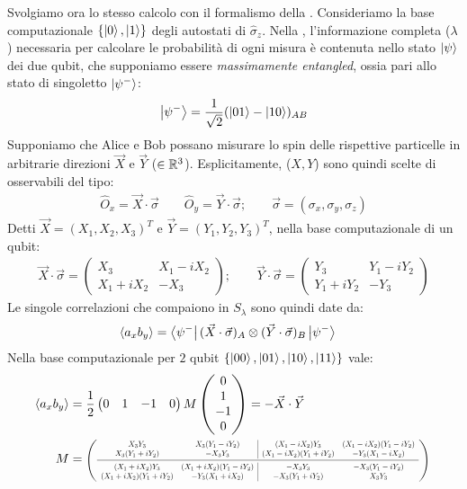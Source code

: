 \documentclass[../../InformazioneQuantistica.tex]{subfiles}
\begin{document}
Svolgiamo ora lo stesso calcolo con il formalismo della \MQ. Consideriamo la base computazionale $\{\Ket{0},\Ket{1}\}$ degli autostati di $\hat{\sigma}_z$. Nella \MQ, l'informazione completa ($\lambda$) necessaria per calcolare le probabilità di ogni misura è contenuta nello stato $\Ket{\psi}$ dei due qubit, che supponiamo essere \textit{massimamente entangled}, ossia pari allo stato di singoletto $\Ket{\psi^-}$:
\begin{align*}
\Ket{\psi^-}=\frac{1}{\sqrt{2}}(\Ket{01}-\Ket{10})_{AB}
\end{align*}
Supponiamo che Alice e Bob possano misurare lo spin delle rispettive particelle in arbitrarie direzioni $\vec{X}$ e $\vec{Y}$ ($\in \mathbb{R}^3$). Esplicitamente, ($X,Y$) sono quindi scelte di osservabili del tipo:
\begin{align*}
\hat{O}_x = \vec{X}\cdot \vec{\sigma} \qquad \hat{O}_y = \vec{Y}\cdot \vec{\sigma}; \qquad \vec{\sigma} = (\sigma_x, \sigma_y,\sigma_z)
\end{align*}
Detti $\vec{X} = (X_1, X_2, X_3)^T$ e $\vec{Y}=(Y_1, Y_2, Y_3)^T$, nella base computazionale di un qubit:
\begin{align*}
\vec{X} \cdot \vec{\sigma} = \begin{pmatrix} X_3 & X_1-iX_2\\ X_1 +iX_2 & -X_3\end{pmatrix}; \qquad \vec{Y} \cdot \vec{\sigma} = \begin{pmatrix} Y_3 & Y_1-iY_2\\ Y_1+iY_2 & -Y_3 \end{pmatrix}
\end{align*}
Le singole correlazioni che compaiono in $S_\lambda$ sono quindi date da:
\begin{align*}
\langle a_x b_y\rangle &= \Bra{\psi^-}(\vec{X} \cdot \vec{\sigma})_A \otimes (\vec{Y} \cdot \vec{\sigma})_B \Ket{\psi^-}
\end{align*}
Nella base computazionale per $2$ qubit $\{\Ket{00}, \Ket{01}, \Ket{10}, \Ket{11}\}$ vale:
\begin{align}\label{eqn:corr-mq}
\langle a_xb_y \rangle &= \frac{1}{2} \begin{pmatrix} 0 & 1 & -1 & 0 \end{pmatrix} M \begin{pmatrix} 
0 \\ 1 \\ -1 \\ 0
\end{pmatrix} = - \vec{X}\cdot \vec{Y} \\ \nonumber
M&= 
 \resizebox{0.8\hsize}{!}{%
$\left({\begin{array}{cc|cc}
X_3 Y_3 & X_3(Y_1-iY_2) & (X_1-iX_2)Y_3 & (X_1-iX_2)(Y_1-iY_2)\\
X_3(Y_1+iY_2) & -X_3 Y_3 & (X_1-iX_2)(Y_1+iY_2) & -Y_3(X_1-iX_2)\\ \midrule 
(X_1+iX_2)Y_3 & (X_1+iX_2)(Y_1-iY_2) & -X_3Y_3 &-X_3(Y_1-iY_2)\\
(X_1+iX_2)(Y_1+iY_2) & -Y_3(X_1+iX_2) & -X_3(Y_1+iY_2) & X_3Y_3
\end{array}} \right)$ }
\end{align}
\end{document}
